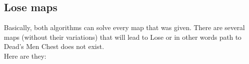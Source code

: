 \documentclass[a4paper]{article}
\begin{document}
\subsection{Lose maps}
Basically, both algorithms can solve every map that was given. There are several maps (without their variations) that will lead to Lose or in other words path to Dead's Men Chest does not exist.\\
Here are they:

\begin{figure}[H]
    \centering
    \hfill %
    \hfill
    \hfill
    \hfill
\end{figure}
\end{document}
